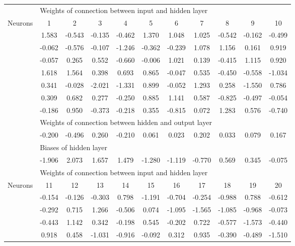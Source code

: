 \begin{table}[htbp] 
 \centering 
\begin{tabular}{l|cccccccccc} 
 \hline 
   &    \multicolumn{10}{l}{Weights of connection between input and hidden layer}  \\ 
 Neurons & 1 &  2 &  3 &  4 &  5 &  6 &  7 &  8 & 9 & 10 \\ 
 \hline 
  & 1.583 &  -0.543 &  -0.135 &  -0.462 &  1.370 &  1.048 &  1.025 &  -0.542 &  -0.162 &  -0.499 \\ 
  & -0.062 &  -0.576 &  -0.107 &  -1.246 &  -0.362 &  -0.239 &  1.078 &  1.156 &  0.161 &  0.919 \\ 
  & -0.057 &  0.265 &  0.552 &  -0.660 &  -0.006 &  1.021 &  0.139 &  -0.415 &  1.115 &  0.920 \\ 
  & 1.618 &  1.564 &  0.398 &  0.693 &  0.865 &  -0.047 &  0.535 &  -0.450 &  -0.558 &  -1.034 \\ 
  & 0.341 &  -0.028 &  -2.021 &  -1.331 &  0.899 &  -0.052 &  1.293 &  0.258 &  -1.550 &  0.786 \\ 
  & 0.309 &  0.682 &  0.277 &  -0.250 &  0.885 &  1.141 &  0.587 &  -0.825 &  -0.497 &  -0.054 \\ 
  & -0.186 &  0.950 &  -0.373 &  -0.218 &  0.355 &  -0.815 &  0.072 &  1.283 &  0.576 &  -0.740 \\ 
\hline 
   &    \multicolumn{10}{l}{Weights of connection between hidden and output layer}  \\ 
  & -0.200 &  -0.496 &  0.260 &  -0.210 &  0.061 &  0.023 &  0.202 &  0.033 &  0.079 &  0.167 \\ 
\hline 
   &    \multicolumn{10}{l}{Biases of hidden layer}  \\ 
  & -1.906 &  2.073 &  1.657 &  1.479 &  -1.280 &  -1.119 &  -0.770 &  0.569 &  0.345 &  -0.075 \\ 
\hline
\hline  
   &    \multicolumn{10}{l}{Weights of connection between input and hidden layer}  \\ 
 Neurons & 11 &  12 &  13 &  14 &  15 &  16 &  17 &  18 & 19 & 20 \\ 
 \hline 
  & -0.154 &  -0.126 &  -0.303 &  0.798 &  -1.191 &  -0.704 &  -0.254 &  -0.988 &  0.788 &  -0.612 \\ 
  & -0.292 &  0.715 &  1.266 &  -0.506 &  0.074 &  -1.095 &  -1.565 &  -1.085 &  -0.968 &  -0.073 \\ 
  & -0.443 &  1.142 &  0.342 &  -0.198 &  0.545 &  -0.202 &  0.722 &  -0.577 &  -1.573 &  -0.440 \\ 
  & 0.918 &  0.458 &  -1.031 &  -0.916 &  -0.092 &  0.312 &  0.935 &  -0.390 &  -0.489 &  -1.510 \\ 

\end{tabular}
\end{table}
